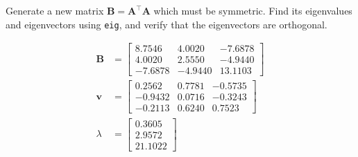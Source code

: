 Generate a new matrix $\boldsymbol{B} = \boldsymbol{A}^\intercal \boldsymbol{A}$ which must be symmetric. Find its eigenvalues and eigenvectors using \texttt{eig}, and verify that the eigenvectors are orthogonal.

\begin{solution}
    \begin{align*}
        \boldsymbol{B} &= \begin{bmatrix}
            8.7546 &  4.0020 & -7.6878 \\
            4.0020 &  2.5550 & -4.9440 \\
           -7.6878 & -4.9440 & 13.1103
        \end{bmatrix} \\
        \boldsymbol{v} &= \begin{bmatrix}
            0.2562 & 0.7781 & -0.5735 \\
           -0.9432 & 0.0716 & -0.3243 \\
           -0.2113 & 0.6240 &  0.7523
        \end{bmatrix} \\
        \lambda &= \begin{bmatrix}
            0.3605 \\
            2.9572 \\
            21.1022
        \end{bmatrix}
    \end{align*}
\end{solution}